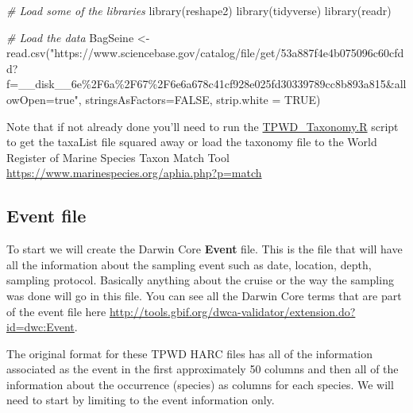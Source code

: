 \documentclass[
]{book}
\newenvironment{Shaded}{\begin{snugshade}}{\end{snugshade}}
\newcommand{\AttributeTok}[1]{\textcolor[rgb]{0.77,0.63,0.00}{#1}}
\newcommand{\CommentTok}[1]{\textcolor[rgb]{0.56,0.35,0.01}{\textit{#1}}}
\newcommand{\ConstantTok}[1]{\textcolor[rgb]{0.00,0.00,0.00}{#1}}
\newcommand{\FunctionTok}[1]{\textcolor[rgb]{0.00,0.00,0.00}{#1}}
\newcommand{\NormalTok}[1]{#1}
\newcommand{\OtherTok}[1]{\textcolor[rgb]{0.56,0.35,0.01}{#1}}
\newcommand{\StringTok}[1]{\textcolor[rgb]{0.31,0.60,0.02}{#1}}
\begin{document}
\begin{Shaded}
\begin{Highlighting}[]
\CommentTok{\# Load some of the libraries}
\FunctionTok{library}\NormalTok{(reshape2)}
\FunctionTok{library}\NormalTok{(tidyverse)}
\FunctionTok{library}\NormalTok{(readr)}
\end{Highlighting}
\end{Shaded}

\begin{Shaded}
\begin{Highlighting}[]
\CommentTok{\# Load the data}
\NormalTok{BagSeine }\OtherTok{\textless{}{-}} \FunctionTok{read.csv}\NormalTok{(}\StringTok{"https://www.sciencebase.gov/catalog/file/get/53a887f4e4b075096c60cfdd?f=\_\_disk\_\_6e\%2F6a\%2F67\%2F6e6a678c41cf928e025fd30339789cc8b893a815\&allowOpen=true"}\NormalTok{, }\AttributeTok{stringsAsFactors=}\ConstantTok{FALSE}\NormalTok{, }\AttributeTok{strip.white =} \ConstantTok{TRUE}\NormalTok{)}
\end{Highlighting}
\end{Shaded}

Note that if not already done you'll need to run the \href{https://www.sciencebase.gov/catalog/file/get/53a887f4e4b075096c60cfdd?f=__disk__ab\%2F6e\%2Ff8\%2Fab6ef8426ea328cb6c54d13ee7b6b7ce791d23f8}{TPWD\_Taxonomy.R} script to get the taxaList file squared away or load the taxonomy file to the World Register of Marine Species Taxon Match Tool \url{https://www.marinespecies.org/aphia.php?p=match}

\hypertarget{event-file}{%
\subsection{Event file}\label{event-file}}

To start we will create the Darwin Core \textbf{Event} file. This is the file that will have all the information about the sampling event such as date, location, depth, sampling protocol. Basically anything about the cruise or the way the sampling was done will go in this file. You can see all the Darwin Core terms that are part of the event file here \url{http://tools.gbif.org/dwca-validator/extension.do?id=dwc:Event}.

The original format for these TPWD HARC files has all of the information associated as the event in the first approximately 50 columns and then all of the information about the occurrence (species) as columns for each species. We will need to start by limiting to the event information only.
\end{document}
